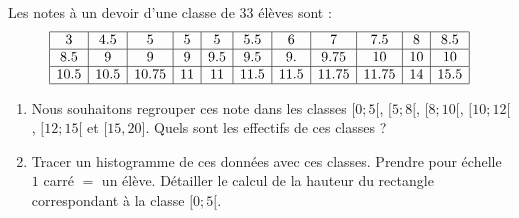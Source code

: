 
\begin{exercice}[\ldots/4]\label{exosmath-0668}

    Les notes à un devoir d'une classe de \( 33\) élèves sont :
    \begin{equation*}
        \begin{array}[]{|c|c|c|c|c|c|c|c|c|c|c|}
            \hline
            3&4.5    &5&5&5&5.5&6&7&7.5   &8&8.5\\
            \hline
            8.5&9&9&9&9.5&9.5&9.&9.75    &10&10&10\\
            \hline
            10.5&10.5&10.75&11&11&11.5&11.5&11.75&11.75&14&15.5\\
            \hline
        \end{array}
    \end{equation*}
    \begin{enumerate}
        \item
            Nous souhaitons regrouper ces note dans les classes \( \mathopen[ 0 ;5 [\), \( \mathopen[ 5 ;8 [\), \( \mathopen[ 8 ; 10 [\), \( \mathopen[ 10; 12 [\), \( \mathopen[ 12 ; 15 [\) et \( \mathopen[ 15 , 20 \mathclose]\). Quels sont les effectifs de ces classes ?
        \item
            Tracer un histogramme de ces données avec ces classes. Prendre pour échelle \( 1\) carré \( =\) un élève. Détailler le calcul de la hauteur du rectangle correspondant à la classe \( \mathopen[ 0 ;5 [\).
    \end{enumerate}

\end{exercice}
